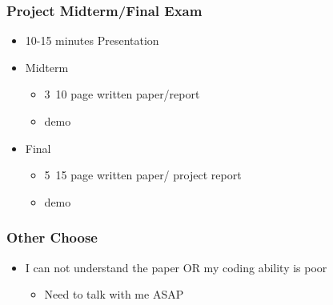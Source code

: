 \begin{frame}[plain]	
	\frametitle{Project Midterm/Final Exam}
	
	\begin{itemize}\Large
		\item 10-15 minutes Presentation
		\item Midterm
		\begin{itemize}\large
			\item 3~10 page written paper/report
			\item demo
			
		\end{itemize}
		\item Final
		\begin{itemize}\large
			\item 5~15 page written paper/ project report
			\item demo
			
		\end{itemize}	
	\end{itemize}
	
	
\end{frame}

\begin{frame}[plain]	
	\frametitle{Other Choose}
	
	\begin{itemize}\Large
		\item I can not understand the paper OR my coding
		ability is poor
		\begin{itemize}\large
			\item Need to talk with me ASAP
			
		\end{itemize}
	\end{itemize}
	
	
\end{frame}
